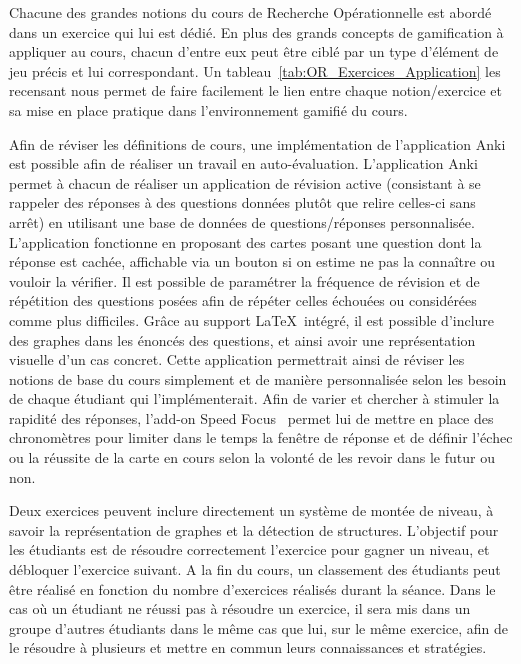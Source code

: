 Chacune des grandes notions du cours de Recherche Opérationnelle est abordé dans un exercice qui lui est dédié. En plus des grands concepts de gamification à appliquer au cours, chacun d'entre eux peut être ciblé par un type d'élément de jeu précis et lui correspondant. Un tableau~\ref{tab:OR_Exercices_Application} les recensant nous permet de faire facilement le lien entre chaque notion/exercice et sa mise en place pratique dans l'environnement gamifié du cours. \par
Afin de réviser les définitions de cours, une implémentation de l'application Anki est possible afin de réaliser un travail en auto-évaluation. L'application Anki~\cite{anki-site} permet à chacun de réaliser un application de révision active (consistant à se rappeler des réponses à des questions données plutôt que relire celles-ci sans arrêt) en utilisant une base de données de questions/réponses personnalisée. L'application fonctionne en proposant des cartes posant une question dont la réponse est cachée, affichable via un bouton si on estime ne pas la connaître ou vouloir la vérifier. Il est possible de paramétrer la fréquence de révision et de répétition des questions posées afin de répéter celles échouées ou considérées comme plus difficiles. Grâce au support \LaTeX\ intégré, il est possible d'inclure des graphes dans les énoncés des questions, et ainsi avoir une représentation visuelle d'un cas concret. Cette application permettrait ainsi de réviser les notions de base du cours simplement et de manière personnalisée selon les besoin de chaque étudiant qui l'implémenterait. Afin de varier et chercher à stimuler la rapidité des réponses, l'add-on Speed Focus~\cite{anki-addon} permet lui de mettre en place des chronomètres pour limiter dans le temps la fenêtre de réponse et de définir l'échec ou la réussite de la carte en cours selon la volonté de les revoir dans le futur ou non. \par
Deux exercices peuvent inclure directement un système de montée de niveau, à savoir la représentation de graphes et la détection de structures. L'objectif pour les étudiants est de résoudre correctement l'exercice pour gagner un niveau, et débloquer l'exercice suivant. A la fin du cours, un classement des étudiants peut être réalisé en fonction du nombre d'exercices réalisés durant la séance. Dans le cas où un étudiant ne réussi pas à résoudre un exercice, il sera mis dans un groupe d'autres étudiants dans le même cas que lui, sur le même exercice, afin de le résoudre à plusieurs et mettre en commun leurs connaissances et stratégies. \par
